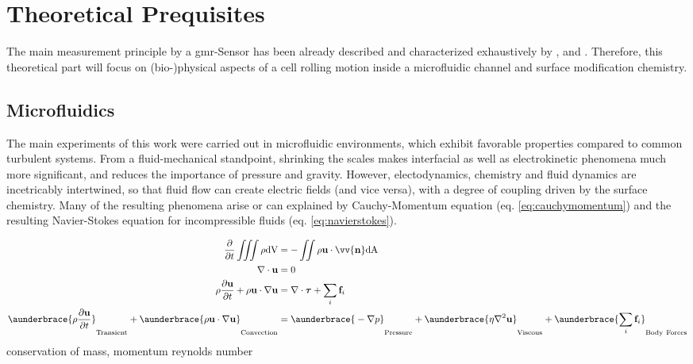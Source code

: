 \chapter{Theoretical Prequisites}
The main measurement principle by a \gls{gmr}-Sensor has been already described and characterized exhaustively by \citet{lit:thes:helou}, \citet{lit:thes:reisbeck} and \citet{lit:thes:brenner}. Therefore, this theoretical part will focus on (bio-)physical aspects of a cell rolling motion inside a microfluidic channel and surface modification chemistry.

\section{Microfluidics}
The main experiments of this work were carried out in microfluidic environments, which exhibit favorable properties compared to common turbulent systems. From a fluid-mechanical standpoint, shrinking the scales makes interfacial as well as electrokinetic phenomena much more significant, and reduces the importance of pressure and gravity.\cite{lit:fluidic:kirby} However, electodynamics, chemistry and fluid dynamics are incetricably intertwined, so that fluid flow can create electric fields (and vice versa), with a degree of coupling driven by the surface chemistry. Many of the resulting phenomena arise or can explained by Cauchy-Momentum equation (eq. \ref{eq:cauchymomentum}) and the resulting Navier-Stokes equation for incompressible fluids (eq. \ref{eq:navierstokes}).

\begin{align}
	\frac{\partial}{\partial t} \iiint \rho \mathrm{dV} &= - \iint \rho \mathbf{u} \cdot \vv{\mathbf{n}} \mathrm{dA} \\
	\nabla \cdot \mathbf{u} &= 0 \\
		\rho \frac{\partial \mathbf{u}}{\partial t} + \rho\mathbf{u} \cdot \nabla \mathbf{u} &= \nabla \cdot \boldsymbol{\tau} + \sum_{i}\mathbf{f}_i \label{eq:cauchymomentum} \\	
	\aunderbrace{\vphantom{\sum_{i}} \rho \frac{\partial \mathbf{u}}{\partial t}}_{\mathrm{Transient}} + \aunderbrace{\vphantom{\sum_{i}}\rho\mathbf{u} \cdot \nabla \mathbf{u}}_{\mathrm{Convection}} &= \aunderbrace{\vphantom{\sum_{i}}-\nabla p}_{\mathrm{Pressure}} + \aunderbrace{\vphantom{\sum_{i}}\eta \nabla^2 \mathbf{u}}_{\mathrm{Viscous}} + \aunderbrace{\sum_{i}\mathbf{f}_i}_{\mathrm{Body \ Forces}} \label{eq:navierstokes}
\end{align}
conservation of mass, momentum
reynolds number
